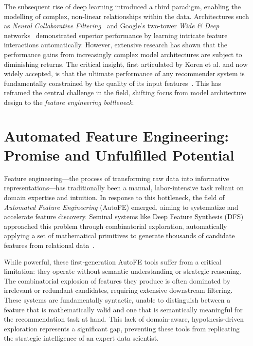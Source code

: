 The subsequent rise of deep learning introduced a third paradigm, enabling the modelling of complex, non-linear relationships within the data. Architectures such as \textit{Neural Collaborative Filtering}~\cite{He2017NCF} and Google's two-tower \textit{Wide \& Deep} networks~\cite{Cheng2016WideDeep} demonstrated superior performance by learning intricate feature interactions automatically. However, extensive research has shown that the performance gains from increasingly complex model architectures are subject to diminishing returns. The critical insight, first articulated by Koren et al. and now widely accepted, is that the ultimate performance of any recommender system is fundamentally constrained by the quality of its input features~\cite{Koren2009MatrixFactorization}. This has reframed the central challenge in the field, shifting focus from model architecture design to the \textit{feature engineering bottleneck}.

\section{Automated Feature Engineering: Promise and Unfulfilled Potential}
\label{sec:intro_autofe}

Feature engineering—the process of transforming raw data into informative representations—has traditionally been a manual, labor-intensive task reliant on domain expertise and intuition. In response to this bottleneck, the field of \textit{Automated Feature Engineering} (AutoFE) emerged, aiming to systematize and accelerate feature discovery. Seminal systems like Deep Feature Synthesis (DFS) approached this problem through combinatorial exploration, automatically applying a set of mathematical primitives to generate thousands of candidate features from relational data~\cite{Kanter2015DeepFeatureSynthesis}.

While powerful, these first-generation AutoFE tools suffer from a critical limitation: they operate without semantic understanding or strategic reasoning. The combinatorial explosion of features they produce is often dominated by irrelevant or redundant candidates, requiring extensive downstream filtering. These systems are fundamentally syntactic, unable to distinguish between a feature that is mathematically valid and one that is semantically meaningful for the recommendation task at hand. This lack of domain-aware, hypothesis-driven exploration represents a significant gap, preventing these tools from replicating the strategic intelligence of an expert data scientist.

